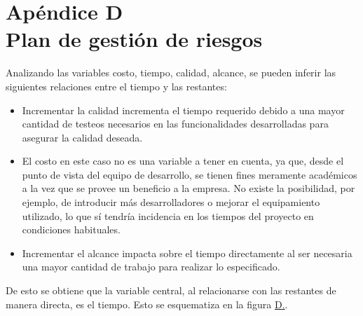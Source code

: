 \documentclass[a4paper, 12pt,twoside]{report}  %
\numberwithin{equation}{subsection} %
\begin{document}
\chapter*{\hypertarget{apendice_d}{}Apéndice D\\Plan de gestión de riesgos}

  \setcounter{counter_img_D}{1}
  \setcounter{counter_tbl_D}{1}

\indent Analizando las variables costo, tiempo, calidad, alcance, se pueden inferir las siguientes relaciones entre el tiempo y las restantes:
\begin{itemize}
	\item Incrementar la calidad incrementa el tiempo requerido debido a una mayor cantidad de testeos necesarios en las funcionalidades desarrolladas para asegurar la calidad deseada.
	\item El costo en este caso no es una variable a tener en cuenta, ya que, desde el punto de vista del equipo de desarrollo, se tienen fines meramente académicos a la vez que se provee un beneficio a la empresa. No existe la posibilidad, por ejemplo, de introducir más desarrolladores o mejorar el equipamiento utilizado, lo que sí tendría incidencia en los tiempos del proyecto en condiciones habituales.
	\item Incrementar el alcance impacta sobre el tiempo directamente al ser necesaria una mayor cantidad de trabajo para realizar lo especificado.
\end{itemize}
De esto se obtiene que la variable central, al relacionarse con las restantes de manera directa, es el tiempo. Esto se esquematiza en la figura \hyperref[relacion variables del proyecto]{D.}.
\end{document}
